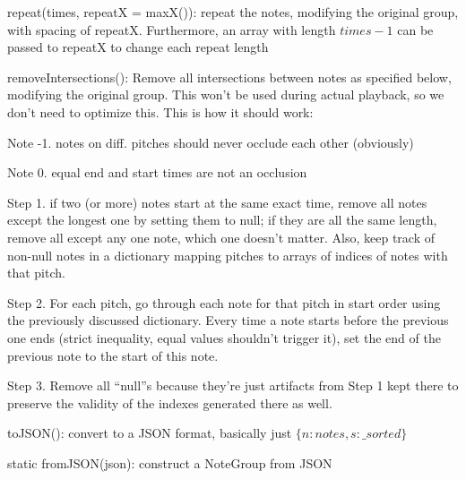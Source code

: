 \documentclass{article}
\begin{document}
repeat(times, repeatX = maxX()): repeat the notes, modifying the original group, with spacing of repeatX. Furthermore, an array with length $times-1$ can be passed to repeatX to change each repeat length

removeIntersections(): Remove all intersections between notes as specified below, modifying the original group. This won't be used during actual playback, so we don't need to optimize this. This is how it should work:

Note -1. notes on diff. pitches should never occlude each other (obviously)

Note 0. equal end and start times are not an occlusion

Step 1. if two (or more) notes start at the same exact time, remove all notes except the longest one by setting them to null; if they are all the same length, remove all except any one note, which one doesn't matter. Also, keep track of non-null notes in a dictionary mapping pitches to arrays of indices of notes with that pitch.

Step 2. For each pitch, go through each note for that pitch in start order using the previously discussed dictionary. Every time a note starts before the previous one ends (strict inequality, equal values shouldn't trigger it), set the end of the previous note to the start of this note.

Step 3. Remove all ``null''s because they're just artifacts from Step 1 kept there to preserve the validity of the indexes generated there as well.

toJSON(): convert to a JSON format, basically just $\{n: notes, s: \_sorted\}$

static fromJSON(json): construct a NoteGroup from JSON
\end{document}
